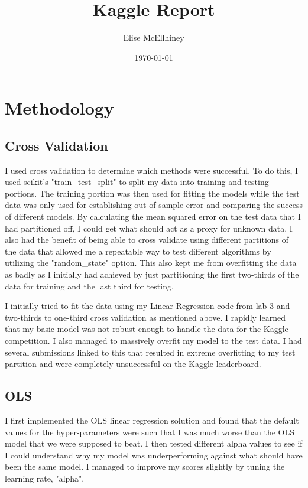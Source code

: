 \documentclass[10pt]{amsart}
\title{Kaggle Report}
\author{Elise McEllhiney}
\date{\today}                                           %
\begin{document}
\maketitle
\section{Methodology}
\subsection{Cross Validation}
I used cross validation to determine which methods were successful.  To do this, I used scikit's "train\_test\_split" to split my data into training and testing portions.  The training portion was then used for fitting the models while the test data was only used for establishing out-of-sample error and comparing the success of different models.  By calculating the mean squared error on the test data that I had partitioned off, I could get what should act as a proxy for unknown data.  I also had the benefit of being able to cross validate using different partitions of the data that allowed me a repeatable way to test different algorithms by utilizing the "random\_state" option.  This also kept me from overfitting the data as badly as I initially had achieved by just partitioning the first two-thirds of the data for training and the last third for testing.

I initially tried to fit the data using my Linear Regression code from lab 3 and two-thirds to one-third cross validation as mentioned above.  I rapidly learned that my basic model was not robust enough to handle the data for the Kaggle competition.  I also managed to massively overfit my model to the test data.  I had several submissions linked to this that resulted in extreme overfitting to my test partition and were completely unsuccessful on the Kaggle leaderboard.

\subsection{OLS}
I first implemented the OLS linear regression solution and found that the default values for the hyper-parameters were such that I was much worse than the OLS model that we were supposed to beat.  I then tested different alpha values to see if I could understand why my model was underperforming against what should have been the same model.  I managed to improve my scores slightly by tuning the learning rate, "alpha".
\end{document}
